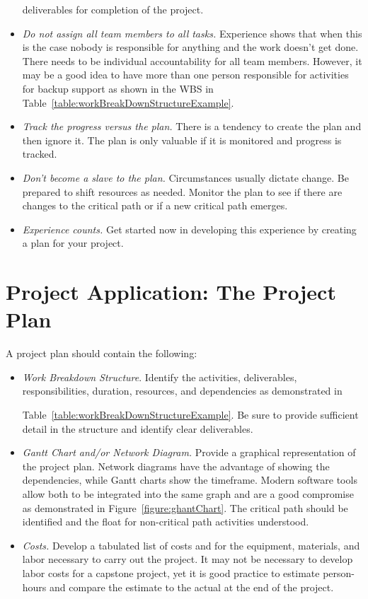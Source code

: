 \begin{itemize}
  deliverables for completion of the project.
\item
  \emph{Do not assign all team members to all tasks.} Experience shows
  that when this is the case nobody is responsible for anything and the
  work doesn't get done. There needs to be individual accountability for
  all team members. However, it may be a good idea to have more than one
  person responsible for activities for backup support as shown in the
  WBS in Table~\ref{table:workBreakDownStructureExample}.
\item
  \emph{Track the progress versus the plan.} There is a tendency to
  create the plan and then ignore it. The plan is only valuable if it is
  monitored and progress is tracked.
\item
  \emph{Don't become a slave to the plan.} Circumstances usually dictate
  change. Be prepared to shift resources as needed. Monitor the plan to
  see if there are changes to the critical path or if a new critical
  path emerges.
\item
  \emph{Experience counts.} Get started now in developing this
  experience by creating a plan for your project.
\end{itemize}

\section{Project Application: The Project Plan}
\label{section:project-application-the-project-plan}

A project plan should contain the following:

\begin{itemize}
\item
  \emph{Work Breakdown Structure}. Identify the activities,
  deliverables, responsibilities, duration, resources, and dependencies
  as demonstrated in 

Table~\ref{table:workBreakDownStructureExample}. Be sure to 
provide sufficient detail in
  the structure and identify clear deliverables.
\item
  \emph{Gantt Chart and/or Network Diagram.} Provide a graphical
  representation of the project plan. Network diagrams have the
  advantage of showing the dependencies, while Gantt charts show the
  timeframe. Modern software tools allow both to be integrated into the
  same graph and are a good compromise as demonstrated in 
Figure~\ref{figure:ghantChart}.
  The critical path should be identified and the float for non-critical
  path activities understood.
\item
  \emph{Costs.} Develop a tabulated list of costs and for the equipment,
  materials, and labor necessary to carry out the project. It may not be
  necessary to develop labor costs for a capstone project, yet it is
  good practice to estimate person-hours and compare the estimate to the
  actual at the end of the project.
\end{itemize}


